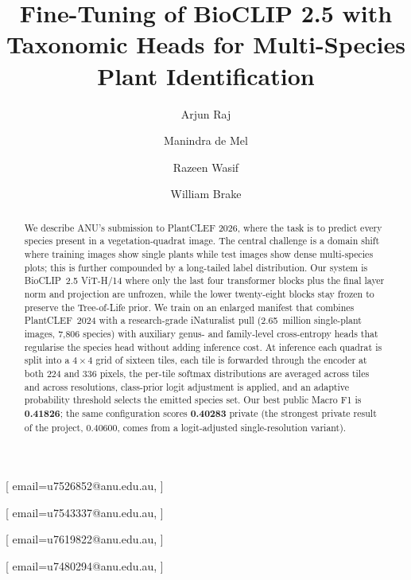 


\title{Fine-Tuning of BioCLIP 2.5 with Taxonomic Heads for Multi-Species Plant Identification}

\author[1]{Arjun Raj}[%
  email=u7526852@anu.edu.au,
]
\fnmark[1]

\address[1]{The Australian National University, Canberra, ACT 2601, Australia}

\author[1]{Manindra de Mel}[%
  email=u7543337@anu.edu.au,
]
\cormark[1]
\fnmark[1]

\author[1]{Razeen Wasif}[%
  email=u7619822@anu.edu.au,
]
\fnmark[1]

\author[1]{William Brake}[%
  email=u7480294@anu.edu.au,
]
\fnmark[1]


\begin{abstract}
We describe ANU's submission to PlantCLEF 2026, where the task is to
predict every species present in a vegetation-quadrat image. The
central challenge is a domain shift where training images show single
plants while test images show dense multi-species plots; this is
further compounded by a long-tailed label distribution. Our system is
BioCLIP~2.5 ViT-H/14 where only the last four transformer blocks plus
the final layer norm and projection are unfrozen, while the lower
twenty-eight blocks stay frozen to preserve the Tree-of-Life prior. We
train on an enlarged manifest that combines PlantCLEF~2024 with a
research-grade iNaturalist pull (2.65~million single-plant images,
7{,}806 species) with auxiliary genus- and family-level cross-entropy
heads that regularise the species head without adding inference cost. At inference each quadrat is split into a $4{\times}4$ grid of
sixteen tiles, each tile is forwarded through the encoder at both
$224$ and $336$ pixels, the per-tile softmax distributions are
averaged across tiles and across resolutions, class-prior logit
adjustment is applied, and an adaptive probability threshold selects
the emitted species set. Our best public Macro F1 is \textbf{0.41826}; the same
configuration scores \textbf{0.40283} private (the strongest private
result of the project, $0.40600$, comes from a logit-adjusted
single-resolution variant).
\end{abstract}

